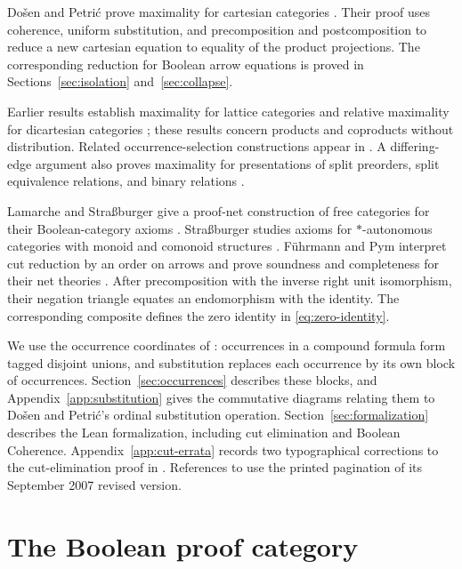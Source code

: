 \documentclass[11pt]{article}
\begin{document}
Do\v{s}en and Petri\'c prove maximality for cartesian categories
\cite[\S5]{DPCartesian}. Their proof uses coherence, uniform
substitution, and precomposition and postcomposition to reduce a new
cartesian equation to equality of the product projections. The
corresponding reduction for Boolean arrow equations is proved in
Sections~\ref{sec:isolation} and~\ref{sec:collapse}.

Earlier results establish maximality for lattice categories and relative
maximality for dicartesian categories
\cite[\S\S8--10]{DPBicartesian}; these results concern products and
coproducts without distribution. Related occurrence-selection
constructions appear in \cite[Lemma~6]{DPIsomorphic}. A differing-edge
argument also proves maximality for presentations of split preorders,
split equivalence relations, and binary relations \cite[\S16]{DPSplit}.

Lamarche and Stra{\ss}burger give a proof-net construction of free
categories for their Boolean-category axioms
\cite[Theorem~3.5.4]{LSFree}.
Stra{\ss}burger studies axioms for $*$-autonomous categories with
monoid and comonoid structures \cite{Strassburger}.
F\"uhrmann and Pym interpret cut reduction by an order on arrows and
prove soundness and completeness for their net theories
\cite[Theorems~6.4--6.5]{FP}.
After precomposition with the inverse right unit isomorphism, their
negation triangle \cite[(11), p.~28]{FP} equates an endomorphism with
the identity. The corresponding composite defines the
zero identity in \eqref{eq:zero-identity}.

We use the occurrence coordinates of \cite[\S9]{Notation}: occurrences
in a compound formula form tagged disjoint unions, and substitution
replaces each occurrence by its own block of occurrences.
Section~\ref{sec:occurrences} describes these blocks, and
Appendix~\ref{app:substitution} gives the commutative diagrams relating
them to Do\v{s}en and Petri\'c's ordinal substitution operation.
Section~\ref{sec:formalization} describes the Lean formalization,
including cut elimination and Boolean Coherence.
Appendix~\ref{app:cut-errata} records two typographical corrections to the
cut-elimination proof in \cite{DP}.
References to \cite{DP} use the printed
pagination of its September 2007 revised version.

\section{The Boolean proof category}\label{sec:category}
\end{document}
